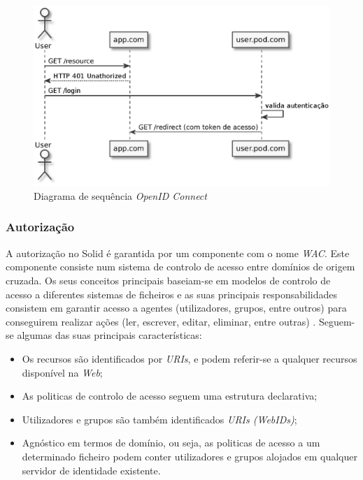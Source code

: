 \begin{figure}[H]
    \centering
    \includegraphics[width=0.8 \textwidth]{figures/open_id_connect_sd.eps}
    \caption{Diagrama de sequência \emph{OpenID Connect}}
    \label{open-id-connect-sequence-diagram}
\end{figure}

\subsubsection{Autorização}
A autorização no Solid é garantida por um componente com o nome \emph{\acrfull{WAC}}. Este componente consiste num sistema de controlo de acesso entre domínios de origem cruzada. Os seus conceitos principais baseiam-se em modelos de controlo de acesso a diferentes sistemas de ficheiros e as suas principais responsabilidades consistem em garantir acesso a agentes (utilizadores, grupos, entre outros) para conseguirem realizar ações (ler, escrever, editar, eliminar, entre outras) \cite{solid_web_access_control}.
Seguem-se algumas das suas principais características:
\begin{itemize}
    \item Os recursos são identificados por \emph{URIs}, e podem referir-se a qualquer recursos disponível na \emph{Web};
    \item As politicas de controlo de acesso seguem uma estrutura declarativa;
    \item Utilizadores e grupos são também identificados \emph{URIs (WebIDs)};
    \item Agnóstico em termos de domínio, ou seja, as politicas de acesso a um determinado ficheiro podem conter utilizadores e grupos alojados em qualquer servidor de identidade existente.
\end{itemize}

